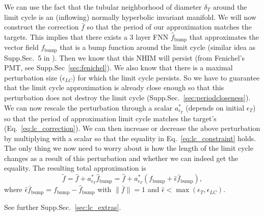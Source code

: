 \documentclass{article}
\theoremstyle{definition} \newtheorem{definition}{Definition}
\theoremstyle{remark} \newtheorem{remark}{Remark}
\newcounter{ct}
\begin{document}
We can use the fact that the tubular neighborhood of diameter $\delta_T$ around the limit cycle is an (inflowing) normally hyperbolic invariant manifold.
We will now construct the correction $\bar{f}$ so that the period of our approximation matches the targets.
This implies that there exists a 3 layer FNN $\hat f_{\operatorname{bump}}$ that approximates the vector field $f_{\operatorname{bump}}$ that is a bump function around the limit cycle (similar idea as Supp.Sec.~5 in \citep{Sagodi2024a}). %
Then we know that this NHIM will persist (from Fenichel's PMT, see Supp.Sec~\ref{sec:fenichel}).
We also know that there is a maximal perturbation size ($\epsilon_{LC}$) for which the limit cycle persists.
So we have to guarantee that the limit cycle approximation is already close enough so that this perturbation does not destroy the limit cycle (Supp.Sec.~\ref{sec:periodcloseness}). %
We can now rescale the perturbation through a scalar $a_{\epsilon_T}^*$ (depends on initial $\epsilon_T$) so that the period of approximation limit cycle matches the target's (Eq.~\ref{eq:lc_correction}). 
We can then increase or decrease the above perturbation by multiplying with a scalar so that the equality in Eq.~\ref{eq:lc_constraint} holds.
The only thing we now need to worry about is how the length of the limit cycle changes as a result of this perturbation and whether we can indeed get the equality.
%
The resulting total approximation is %
\begin{equation}\label{eq:lc_correction}
\tilde{f}= \hat{f}+a_{\epsilon_T}^*\hat f_{\operatorname{bump}} = 
 \hat{f} + a_{\epsilon_T}^*(f_{\operatorname{bump}}+ \hat{\epsilon}\bar{f}_{\operatorname{bump}}),
 \end{equation}
where $\hat{\epsilon}\bar{f}_{\operatorname{bump}} = f_{\operatorname{bump}} -\hat f_{\operatorname{bump}}$ with $\|\bar f\|=1$ and $\hat \epsilon <\max(\epsilon_T,\epsilon_{LC})$. %
%

See further Supp.Sec.~\ref{sec:lc_extras}.
\end{document}

